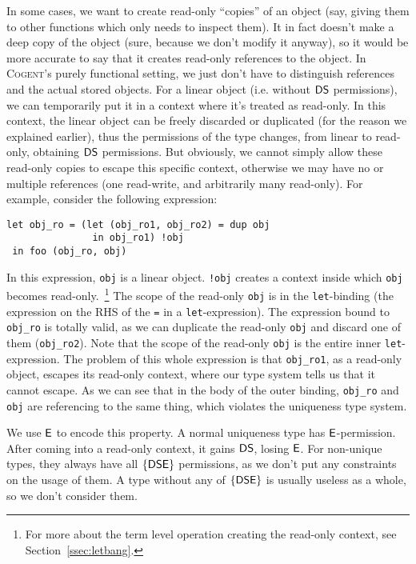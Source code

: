 \documentclass[a4paper]{article}
\newcommand{\inlinecogent}[1]{\lstinline[language=Cogent,basicstyle=\ttfamily\normalsize]{#1}\xspace}
\newcommand{\cogent}{\textsc{Cogent}\xspace}
\begin{document}
In some cases, we want to create read-only ``copies'' of an object (say, giving them to other functions which only needs to inspect them).
It in fact doesn't make a deep copy of the object (sure, because we don't modify it anyway), so it would be more accurate to say
that it creates read-only references to the object. In \cogent's purely functional setting, we just don't have to distinguish
references and the actual stored objects.
For a linear object (i.e. without $\mathsf{DS}$ permissions), we can temporarily put it in a context where it's treated as read-only.
In this context, the linear object can be freely discarded or duplicated (for the reason we explained earlier), thus the permissions 
of the type changes, from linear to read-only, obtaining $\mathsf{DS}$ permissions. But obviously, we cannot simply allow
these read-only copies to escape this specific context, otherwise we may have no or multiple references (one read-write, and
arbitrarily many read-only). For example, consider the following expression:
\begin{lstlisting}[language=Cogent]
let obj_ro = (let (obj_ro1, obj_ro2) = dup obj
               in obj_ro1) !obj
 in foo (obj_ro, obj)
\end{lstlisting}
In this expression, \inlinecogent{obj} is a linear object. \inlinecogent{!obj} creates a context inside which
\inlinecogent{obj} becomes read-only.~\footnote{For
more about the term level operation creating the read-only context, see Section~\ref{ssec:letbang}.}
The scope of the read-only \inlinecogent{obj} is in the \inlinecogent{let}-binding (the expression on the RHS of the \inlinecogent{=} in
a \inlinecogent{let}-expression). The expression bound to \inlinecogent{obj_ro} is totally
valid, as we can duplicate the read-only \inlinecogent{obj} and discard one of them (\inlinecogent{obj_ro2}). 
Note that the scope of the read-only
\inlinecogent{obj} is the entire inner \inlinecogent{let}-expression. The problem of this whole expression
is that \inlinecogent{obj_ro1}, as a read-only object, escapes its read-only context, where our type system
tells us that it cannot escape. As we can see that in
the body of the outer binding, \inlinecogent{obj_ro} and \inlinecogent{obj} are referencing to the same thing,
which violates the uniqueness type system.

We use $\mathsf{E}$ to encode this property. A normal
uniqueness type has $\mathsf{E}$-permission. After coming into a read-only context, it gains 
$\mathsf{DS}$, losing $\mathsf{E}$. For non-unique types,
they always have all $\mathsf{\{DSE\}}$ permissions, as we don't put any constraints on the usage of them. A type
without any of $\mathsf{\{DSE\}}$ is usually useless as a whole, so we don't consider them.
\end{document}
